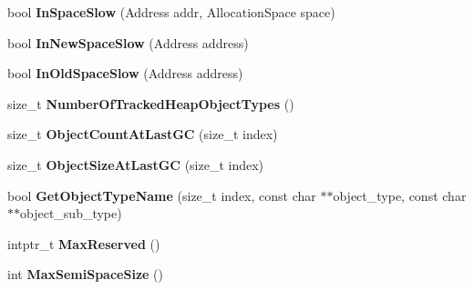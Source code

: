 \begin{DoxyCompactItemize}
\item 
bool {\bfseries In\+Space\+Slow} (Address addr, Allocation\+Space space)\hypertarget{classv8_1_1internal_1_1_heap_af692c3f8842e830d5f517a6bb9e54fef}{}\label{classv8_1_1internal_1_1_heap_af692c3f8842e830d5f517a6bb9e54fef}

\item 
bool {\bfseries In\+New\+Space\+Slow} (Address address)\hypertarget{classv8_1_1internal_1_1_heap_a5d6440e5e8b6cb2736d3ecd6fae1e675}{}\label{classv8_1_1internal_1_1_heap_a5d6440e5e8b6cb2736d3ecd6fae1e675}

\item 
bool {\bfseries In\+Old\+Space\+Slow} (Address address)\hypertarget{classv8_1_1internal_1_1_heap_a320a20c793bcb74922ca0b0467383235}{}\label{classv8_1_1internal_1_1_heap_a320a20c793bcb74922ca0b0467383235}

\item 
size\+\_\+t {\bfseries Number\+Of\+Tracked\+Heap\+Object\+Types} ()\hypertarget{classv8_1_1internal_1_1_heap_a6b0ac34c0037e196b1f100e2a7ea51e2}{}\label{classv8_1_1internal_1_1_heap_a6b0ac34c0037e196b1f100e2a7ea51e2}

\item 
size\+\_\+t {\bfseries Object\+Count\+At\+Last\+GC} (size\+\_\+t index)\hypertarget{classv8_1_1internal_1_1_heap_a408afa8ac3510d56f1d924c42a390097}{}\label{classv8_1_1internal_1_1_heap_a408afa8ac3510d56f1d924c42a390097}

\item 
size\+\_\+t {\bfseries Object\+Size\+At\+Last\+GC} (size\+\_\+t index)\hypertarget{classv8_1_1internal_1_1_heap_aff66cefa5487f3f4542e69fdda2aaf99}{}\label{classv8_1_1internal_1_1_heap_aff66cefa5487f3f4542e69fdda2aaf99}

\item 
bool {\bfseries Get\+Object\+Type\+Name} (size\+\_\+t index, const char $\ast$$\ast$object\+\_\+type, const char $\ast$$\ast$object\+\_\+sub\+\_\+type)\hypertarget{classv8_1_1internal_1_1_heap_aa34db80677b2477b93fb4a96273b5799}{}\label{classv8_1_1internal_1_1_heap_aa34db80677b2477b93fb4a96273b5799}

\item 
intptr\+\_\+t {\bfseries Max\+Reserved} ()\hypertarget{classv8_1_1internal_1_1_heap_a6985f7237d936063f214cc5ff7492467}{}\label{classv8_1_1internal_1_1_heap_a6985f7237d936063f214cc5ff7492467}

\item 
int {\bfseries Max\+Semi\+Space\+Size} ()\hypertarget{classv8_1_1internal_1_1_heap_aea940688ad0d52c47b7145e4e1c9497a}{}\label{classv8_1_1internal_1_1_heap_aea940688ad0d52c47b7145e4e1c9497a}


\end{DoxyCompactItemize}
